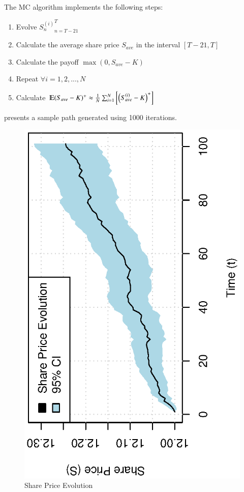 \documentclass[12pt,a4paper]{article}
\begin{document}
The MC algorithm implements the following steps:
\begin{enumerate}
\item Evolve ${S_{n}^{(i)}}_{n=T-21}^{T}$
\item Calculate the average share price $S_{ave}$ in the interval $[T-21,T]$
\item Calculate the payoff $\max(0,S_{ave}-K)$
\item Repeat $\forall i=1,2,...,N$
\item Calculate $\varmathbb{E}(S_{ave}-K)^{+}\approx\frac{1}{N}\sum_{i=1}^{N}\left[\left(S_{ave}^{(i)}-K\right)^{+}\right]$
\end{enumerate}

 presents a sample path generated using 1000
iterations.

\begin{figure}[!ht]
  \centering
  \includegraphics[scale=0.85,angle=-90]{./images/pseudo/share_evo.eps}
  \caption{Share Price Evolution}
  \label{fig:share-evo}
\end{figure}
\end{document}
